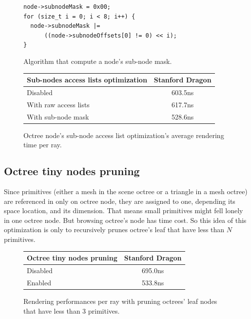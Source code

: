 \documentclass[10pt,twocolumn,a4paper]{article}
\begin{document}
\begin{figure}[H]
    \centering
    \begin{lstlisting}[morekeywords={uint8_t,uint32_t}]
node->subnodeMask = 0x00;
for (size_t i = 0; i < 8; i++) {
  node->subnodeMask |=
      ((node->subnodeOffsets[0] != 0) << i);
}
    \end{lstlisting}
    \caption{Algorithm that compute a node's sub-node mask.}
    \label{code:mask_access_list}
\end{figure}

\begin{figure}[H]
    \tiny
    \centering
    \begin{tabular}{ | l | c | }
        \hline
        Sub-nodes access lists optimization & Stanford Dragon \\
        \hline
        Disabled & 603.5ns \\
        With raw access lists & 617.7ns \\
        With sub-node mask & 528.6ns \\
        \hline
    \end{tabular}
    \caption{
        Octree node's sub-node access list optimization's average rendering
        time per ray.
    }
    \label{table:subnode_access_list}
\end{figure}


\subsection{Octree tiny nodes pruning}
Since primitives (either a mesh in the scene octree or a triangle in a mesh
octree) are referenced in only on octree node, they are assigned to one,
depending its space location, and its dimension. That means small primitives
might fell lonely in one octree node. But browsing octree's node has time cost.
So this idea of this optimization is only to recursively prunes octree's leaf
that have less than $N$ primitives.

\begin{figure}[H]
    \tiny
    \centering
    \begin{tabular}{ | l | c | }
        \hline
        Octree tiny nodes pruning & Stanford Dragon \\
        \hline
        Disabled & 695.0ns \\
        Enabled & 533.8ns \\
        \hline
    \end{tabular}
    \caption{
        Rendering performances per ray with pruning octrees' leaf nodes that
        have less than 3 primitives.
    }
    \label{table:octree_tiny_node_pruning}
\end{figure}
\end{document}
